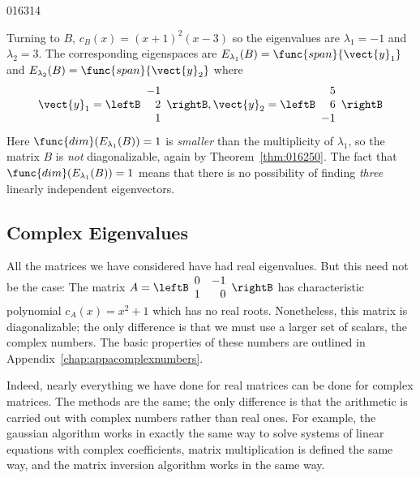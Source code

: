 \begin{example}{}{016314}
\begin{solution}
Turning to $B$, $c_{B}(x) = (x + 1)^{2}(x - 3)$ so the eigenvalues are $\lambda_{1} = -1$ and $\lambda_{2} = 3$. The corresponding eigenspaces are $E_{\lambda_1}(B) =\func{span}\{\vect{y}_{1}\}$ and $E_{\lambda_2}(B) = \func{span}\{\vect{y}_{2}\}$ where
\begin{equation*}
\vect{y}_1 = 
\leftB \begin{array}{r}
-1\\
2\\
1
\end{array} \rightB
, \vect{y}_2 =
\leftB \begin{array}{r}
5\\
6\\
-1
\end{array} \rightB
\end{equation*}
Here $\func{dim}(E_{\lambda_1}(B)) = 1$ is \textit{smaller} than the multiplicity of $\lambda_{1}$, so the matrix $B$ is \textit{not} diagonalizable, again by Theorem~\ref{thm:016250}. The fact that $\func{dim}(E_{\lambda_1}(B)) = 1$ means that there is no possibility of finding \textit{three} linearly independent eigenvectors.
\end{solution}
\end{example}

\subsection*{Complex Eigenvalues}

All the matrices we have considered have had real eigenvalues. But this need not be the case: The matrix
$A = 
\leftB \begin{array}{rr}
0 & -1 \\
1 & 0
\end{array} \rightB$
 has characteristic polynomial $c_{A}(x) = x^{2} + 1$ which has no real roots. Nonetheless, this matrix is diagonalizable; the only difference is that we must use a larger set of scalars, the complex numbers. The basic properties of these numbers are outlined in Appendix~\ref{chap:appacomplexnumbers}.

Indeed, nearly everything we have done for real matrices can be done for complex matrices. The methods are the same; the only difference is that the arithmetic is carried out with complex numbers rather than real ones. For example, the gaussian algorithm works in exactly the same way to solve systems of linear equations with complex coefficients, matrix multiplication is defined 
the same way, and the matrix inversion algorithm works in the same way.

